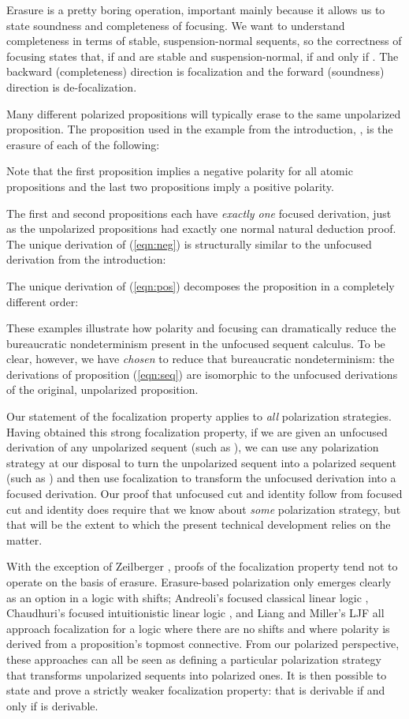 \documentclass[acmtocl]{robtrans}\pdfoutput=1
\begin{document}
Erasure is a pretty boring operation, important mainly because it
allows us to state soundness and completeness of focusing. We want to
understand completeness in terms of stable, suspension-normal
sequents, so the correctness of focusing states that, if 
and  are stable and suspension-normal,  if
and only if . The
backward (completeness) direction is focalization and the forward
(soundness) direction is de-focalization.

Many different polarized propositions will typically erase to the same
unpolarized proposition.  The proposition used in the example from the
introduction, , is the erasure of each of the following:

Note that the first proposition implies a 
negative polarity for all atomic propositions and the last two propositions
imply a positive polarity. 

The first and second propositions
each have {\it exactly one} focused 
derivation, just as the unpolarized propositions
had exactly one normal natural deduction proof. The unique derivation of 
(\ref{eqn:neg}) is structurally similar to the unfocused derivation from the
introduction:


The unique derivation of (\ref{eqn:pos}) decomposes the proposition
in a completely different order:

These examples illustrate how polarity and focusing can dramatically
reduce the bureaucratic nondeterminism present in the unfocused
sequent calculus. To be clear, however, we have {\it chosen} to reduce
that bureaucratic nondeterminism: the derivations of proposition
(\ref{eqn:seq}) are isomorphic to the unfocused derivations of the
original, unpolarized proposition.

Our statement of the focalization property applies to {\it all}
polarization strategies.  Having obtained this strong focalization
property, if we are given an unfocused derivation of any unpolarized
sequent (such as ), we can use any polarization strategy at our
disposal to turn the unpolarized sequent into a polarized sequent
(such as ) and then use
focalization to transform the unfocused derivation into a focused
derivation. Our proof that unfocused cut and identity follow from
focused cut and identity does require that we know about {\it some}
polarization strategy, but that will be the extent to which the
present technical development relies on the matter.

With the exception of Zeilberger , proofs
of the focalization property tend not to operate on the basis of
erasure. Erasure-based polarization only emerges clearly as an option
in a logic with shifts; Andreoli's focused classical linear logic
, Chaudhuri's focused intuitionistic linear
logic , and Liang and Miller's LJF
 all approach focalization for a logic
where there are no shifts and where polarity is derived from a
proposition's topmost connective.  From our polarized perspective,
these approaches can all be seen as defining a particular polarization
strategy  that transforms unpolarized
sequents into polarized ones. It is then possible to state and prove a
strictly weaker focalization property: that 
is derivable if and only if  is derivable.
\end{document}
